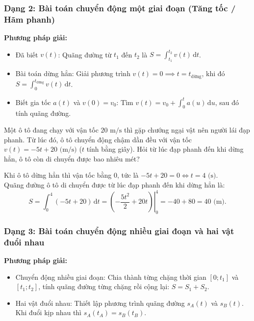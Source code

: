 \documentclass[12pt]{article}
\begin{document}
	\subsubsection{Dạng 2: Bài toán chuyển động một giai đoạn (Tăng tốc / Hãm phanh)}
	\noindent \textbf{Phương pháp giải:}
	\begin{itemize}[itemsep=2pt]
		\item Đã biết $v(t)$: Quãng đường từ $t_1$ đến $t_2$ là $S = \displaystyle \int_{t_1}^{t_2} v(t)\,\mathrm{d}t$.
		\item Bài toán dừng hẳn: Giải phương trình $v(t) = 0 \implies t = t_{\text{dừng}}$, khi đó $S = \displaystyle \int_0^{t_{\text{dừng}}} v(t)\,\mathrm{d}t$.
		\item Biết gia tốc $a(t)$ và $v(0) = v_0$: Tìm $v(t) = v_0 + \displaystyle \int_0^t a(u)\,\mathrm{d}u$, sau đó tính quãng đường.
	\end{itemize}
	
	\begin{vidu}[2]
		Một ô tô đang chạy với vận tốc $20\text{ m/s}$ thì gặp chướng ngại vật nên người lái đạp phanh. Từ lúc đó, ô tô chuyển động chậm dần đều với vận tốc $v(t) = -5t + 20\text{ (m/s)}$ ($t$ tính bằng giây). Hỏi từ lúc đạp phanh đến khi dừng hẳn, ô tô còn di chuyển được bao nhiêu mét?
	\end{vidu}
	\begin{loigiai}
		Khi ô tô dừng hẳn thì vận tốc bằng $0$, tức là $-5t + 20 = 0 \iff t = 4\text{ (s)}$.\\
		Quãng đường ô tô di chuyển được từ lúc đạp phanh đến khi dừng hẳn là:
		\[
		S = \int_0^4 (-5t + 20)\,\mathrm{d}t = \left. \left(-\frac{5t^2}{2} + 20t\right) \right|_0^4 = -40 + 80 = 40\text{ (m)}.
		\]
	\end{loigiai}
	
	\subsubsection{Dạng 3: Bài toán chuyển động nhiều giai đoạn và hai vật đuổi nhau}
	\noindent \textbf{Phương pháp giải:}
	\begin{itemize}[itemsep=2pt]
		\item Chuyển động nhiều giai đoạn: Chia thành từng chặng thời gian $[0; t_1]$ và $[t_1; t_2]$, tính quãng đường từng chặng rồi cộng lại: $S = S_1 + S_2$.
		\item Hai vật đuổi nhau: Thiết lập phương trình quãng đường $s_A(t)$ và $s_B(t)$. Khi đuổi kịp nhau thì $s_A(t_A) = s_B(t_B)$.
	\end{itemize}
	
\end{document}
